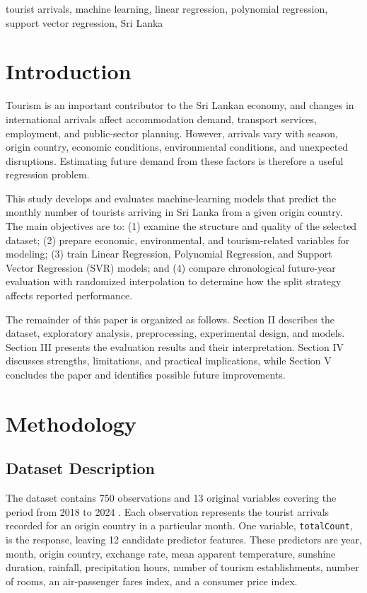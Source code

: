 \documentclass[conference,a4paper]{IEEEtran}
\begin{document}
\begin{IEEEkeywords}
tourist arrivals, machine learning, linear regression, polynomial regression, support vector regression, Sri Lanka
\end{IEEEkeywords}

\section{Introduction}
Tourism is an important contributor to the Sri Lankan economy, and changes in international arrivals affect accommodation demand, transport services, employment, and public-sector planning. However, arrivals vary with season, origin country, economic conditions, environmental conditions, and unexpected disruptions. Estimating future demand from these factors is therefore a useful regression problem.

This study develops and evaluates machine-learning models that predict the monthly number of tourists arriving in Sri Lanka from a given origin country. The main objectives are to: (1) examine the structure and quality of the selected dataset; (2) prepare economic, environmental, and tourism-related variables for modeling; (3) train Linear Regression, Polynomial Regression, and Support Vector Regression (SVR) models; and (4) compare chronological future-year evaluation with randomized interpolation to determine how the split strategy affects reported performance.

The remainder of this paper is organized as follows. Section II describes the dataset, exploratory analysis, preprocessing, experimental design, and models. Section III presents the evaluation results and their interpretation. Section IV discusses strengths, limitations, and practical implications, while Section V concludes the paper and identifies possible future improvements.

\section{Methodology}

\subsection{Dataset Description}
The dataset contains 750 observations and 13 original variables covering the period from 2018 to 2024 \cite{peasinghe_tourist_dataset}. Each observation represents the tourist arrivals recorded for an origin country in a particular month. One variable, \texttt{totalCount}, is the response, leaving 12 candidate predictor features. These predictors are year, month, origin country, exchange rate, mean apparent temperature, sunshine duration, rainfall, precipitation hours, number of tourism establishments, number of rooms, an air-passenger fares index, and a consumer price index.
\end{document}
